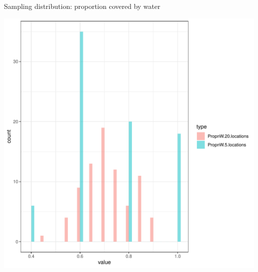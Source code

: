 \documentclass[10pt]{beamer}\usepackage[]{graphicx}\usepackage[]{color}
\makeatletter
\def\maxwidth{ %
  \ifdim\Gin@nat@width>\linewidth
    \linewidth
  \else
    \Gin@nat@width
  \fi
}
\newenvironment{knitrout}{}{} %
\makeatother
\begin{document}
\begin{frame}[fragile]{Sampling distribution: proportion covered by water}
	

	
	
\begin{knitrout}\tiny
{}\color{fgcolor}

{\centering \includegraphics[width=\maxwidth]{figure/unnamed-chunk-4-1} 

}



\end{knitrout}
	
\end{frame}
\end{document}
